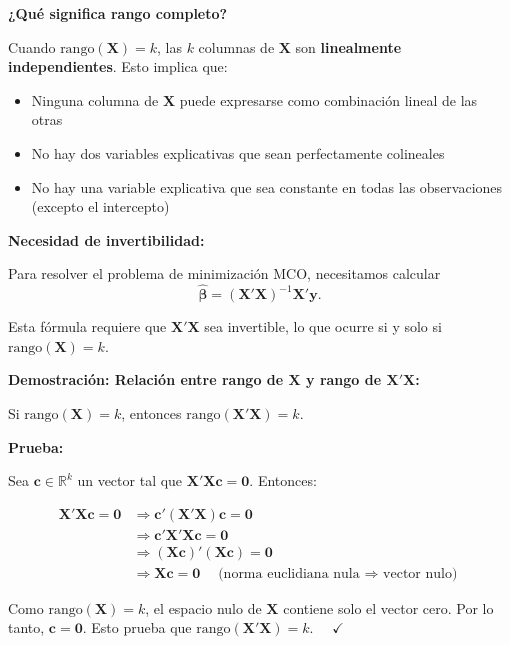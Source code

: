 \documentclass[11pt,a4paper]{article}
\begin{document}
\noindent\textbf{¿Qué significa rango completo?}

Cuando \(\text{rango}(\mathbf{X}) = k\), las \(k\) columnas de \(\mathbf{X}\) son \textbf{linealmente independientes}. Esto implica que:

\begin{itemize}
\item Ninguna columna de \(\mathbf{X}\) puede expresarse como combinación lineal de las otras
\item No hay dos variables explicativas que sean perfectamente colineales
\item No hay una variable explicativa que sea constante en todas las observaciones (excepto el intercepto)
\end{itemize}

\noindent\textbf{Necesidad de invertibilidad:}

Para resolver el problema de minimización MCO, necesitamos calcular
\[
\hat{\boldsymbol{\beta}} = (\mathbf{X}'\mathbf{X})^{-1}\mathbf{X}'\mathbf{y}.
\]

Esta fórmula requiere que \(\mathbf{X}'\mathbf{X}\) sea invertible, lo que ocurre si y solo si \(\text{rango}(\mathbf{X}) = k\).

\noindent\textbf{Demostración: Relación entre rango de \(\mathbf{X}\) y rango de \(\mathbf{X}'\mathbf{X}\):}

\begin{proposicion}
Si \(\text{rango}(\mathbf{X}) = k\), entonces \(\text{rango}(\mathbf{X}'\mathbf{X}) = k\).
\end{proposicion}

\noindent\textbf{Prueba:}

Sea \(\mathbf{c} \in \mathbb{R}^k\) un vector tal que \(\mathbf{X}'\mathbf{X}\mathbf{c} = \mathbf{0}\). Entonces:

\begin{align}
\mathbf{X}'\mathbf{X}\mathbf{c} = \mathbf{0} &\Rightarrow \mathbf{c}'(\mathbf{X}'\mathbf{X})\mathbf{c} = \mathbf{0}\\
&\Rightarrow \mathbf{c}'\mathbf{X}'\mathbf{X}\mathbf{c} = \mathbf{0}\\
&\Rightarrow (\mathbf{X}\mathbf{c})'(\mathbf{X}\mathbf{c}) = \mathbf{0}\\
&\Rightarrow \mathbf{X}\mathbf{c} = \mathbf{0} \quad \text{(norma euclidiana nula $\Rightarrow$ vector nulo)}
\end{align}

Como \(\text{rango}(\mathbf{X}) = k\), el espacio nulo de \(\mathbf{X}\) contiene solo el vector cero. Por lo tanto, \(\mathbf{c} = \mathbf{0}\). Esto prueba que \(\text{rango}(\mathbf{X}'\mathbf{X}) = k\). \(\quad\checkmark\)
\end{document}
